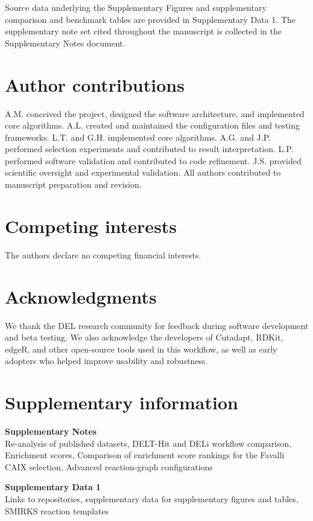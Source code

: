 \documentclass[pdflatex,sn-nature]{sn-jnl}
\begin{document}
Source data underlying the Supplementary Figures and supplementary comparison and benchmark tables are provided in Supplementary Data 1. The supplementary note set cited throughout the manuscript is collected in the Supplementary Notes document.

\section{Author contributions}
A.M. conceived the project, designed the software architecture, and implemented core algorithms. A.L. created and maintained the configuration files and testing frameworks. L.T. and G.H. implemented core algorithms. A.G. and J.P. performed selection experiments and contributed to result interpretation. L.P. performed software validation and contributed to code refinement. J.S. provided scientific oversight and experimental validation. All authors contributed to manuscript preparation and revision.


\section{Competing interests}
The authors declare no competing financial interests.


\section{Acknowledgments}
We thank the DEL research community for feedback during software development and beta testing. We also acknowledge the developers of Cutadapt, RDKit, edgeR, and other open-source tools used in this workflow, as well as early adopters who helped improve usability and robustness.

\section{Supplementary information}
\textbf{Supplementary Notes}\\
Re-analysis of published datasets, DELT-Hit and DELi workflow comparison, Enrichment scores, Comparison of enrichment score rankings for the Favalli CAIX selection, Advanced reaction-graph configurations

\textbf{Supplementary Data 1}\\
Links to repositories, supplementary data for supplementary figures and tables, SMIRKS reaction templates


\end{document}
